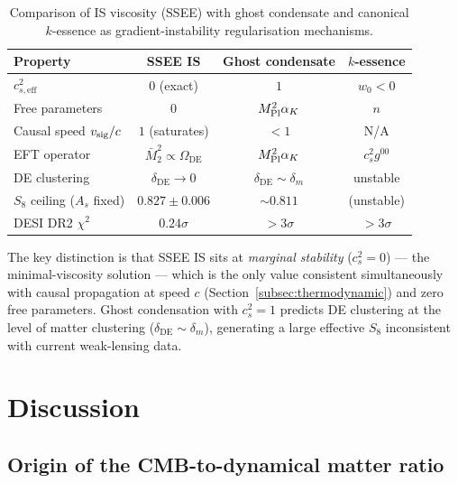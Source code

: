 \documentclass[12pt,a4paper]{article}
\newcommand{\OmDE}{\Omega_{\mathrm{DE}}}
\begin{document}
\begin{table}[h!]
\centering
\caption{Comparison of IS viscosity (SSEE) with ghost condensate and canonical
  $k$-essence as gradient-instability regularisation mechanisms.}
\label{tab:EFT_compare}
\begin{tabular}{lccc}
\toprule
Property & SSEE IS & Ghost condensate & $k$-essence \\
\midrule
$c^2_{s,\mathrm{eff}}$ & $0$ (exact) & $1$ & $w_0 < 0$ \\
Free parameters & 0 & $M_{\rm Pl}^2\alpha_K$ & $n$ \\
Causal speed $v_{\rm sig}/c$ & $1$ (saturates) & $< 1$ & N/A \\
EFT operator & $\bar{M}_2^2 \propto \OmDE$ & $M_{\rm Pl}^2\alpha_K$ & $c^2_s g^{00}$ \\
DE clustering & $\delta_{\mathrm{DE}} \to 0$ & $\delta_{\mathrm{DE}} \sim \delta_m$ & unstable \\
$S_8$ ceiling ($A_s$ fixed) & $0.827 \pm 0.006$ & $\sim 0.811$ & (unstable) \\
DESI DR2 $\chi^2$ & $0.24\sigma$ & $> 3\sigma$ & $> 3\sigma$ \\
\bottomrule
\end{tabular}
\end{table}

The key distinction is that SSEE IS sits at \emph{marginal stability}
($c^2_s = 0$) --- the minimal-viscosity solution --- which is the only value consistent simultaneously with
causal propagation at speed $c$ (Section~\ref{subsec:thermodynamic}) and
zero free parameters.
Ghost condensation with $c^2_s = 1$ predicts DE clustering at the level of
matter clustering ($\delta_{\mathrm{DE}} \sim \delta_m$), generating a large
effective $S_8$ inconsistent with current weak-lensing data.

\section{Discussion}
\label{sec:discussion}

\subsection{Origin of the CMB-to-dynamical matter ratio}
\label{subsec:MIRA_background}
\end{document}
